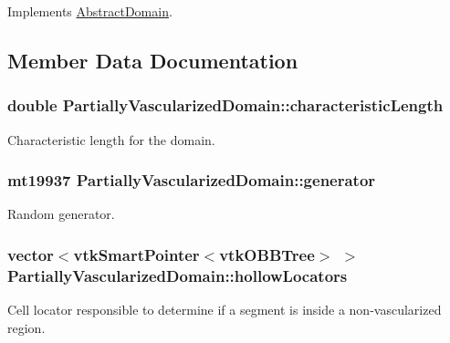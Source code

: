 Implements \hyperlink{class_abstract_domain_a8544eef21fb6700ecc02e9cd50884efd}{Abstract\+Domain}.



\subsection{Member Data Documentation}
\subsubsection[{\texorpdfstring{characteristic\+Length}{characteristicLength}}]{\setlength{\rightskip}{0pt plus 5cm}double Partially\+Vascularized\+Domain\+::characteristic\+Length\hspace{0.3cm}{\ttfamily [private]}}\hypertarget{class_partially_vascularized_domain_ac79741173831cc9628ccf7ad193f2812}{}\label{class_partially_vascularized_domain_ac79741173831cc9628ccf7ad193f2812}
Characteristic length for the domain. 
\subsubsection[{\texorpdfstring{generator}{generator}}]{\setlength{\rightskip}{0pt plus 5cm}mt19937 Partially\+Vascularized\+Domain\+::generator\hspace{0.3cm}{\ttfamily [private]}}\hypertarget{class_partially_vascularized_domain_a78f13fd2210c58eae813d057b580c3cc}{}\label{class_partially_vascularized_domain_a78f13fd2210c58eae813d057b580c3cc}
Random generator. 
\subsubsection[{\texorpdfstring{hollow\+Locators}{hollowLocators}}]{\setlength{\rightskip}{0pt plus 5cm}vector$<$vtk\+Smart\+Pointer$<$vtk\+O\+B\+B\+Tree$>$ $>$ Partially\+Vascularized\+Domain\+::hollow\+Locators\hspace{0.3cm}{\ttfamily [private]}}\hypertarget{class_partially_vascularized_domain_abce195c2c0bd9f52cf932560539aec57}{}\label{class_partially_vascularized_domain_abce195c2c0bd9f52cf932560539aec57}
Cell locator responsible to determine if a segment is inside a non-\/vascularized region. 
